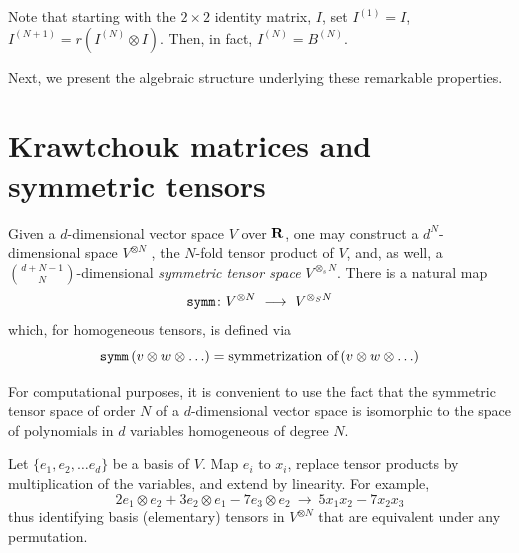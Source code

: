 \documentclass[12pt]{article}
\numberwithin{equation}{section}
\begin{document}
Note that starting with the $2\times2$ identity matrix, $I$, set $I^{(1)}=I$, \\ $I^{(N+1)}=r(I^{(N)}\otimes I)$. 
Then, in fact, $I^{(N)}=B^{(N)}$.\bigskip

Next, we present the algebraic structure underlying these remarkable properties.



\section{Krawtchouk matrices and symmetric tensors}
\label{sec:quantum}
\def\symm{{\tt symm}}

Given a $d$-dimensional vector space $V$ over ${\bf R}$,
one may construct a $d^N$-dimensional space $V^{\otimes N}$ ,
the $N$-fold tensor product of $V$, and, as well, a 
$
     {d+N-1\choose N}
$-dimensional {\sl symmetric tensor space} $V^{\otimes_s N}$. 
There is a natural map 
$$
  \symm\colon V^{\otimes N} \ \longrightarrow \ V^{\otimes_S N} 
$$
which, for homogeneous tensors, is defined via
$$
\symm\,(v\otimes w\otimes \ldots )= \hbox{symmetrization of}\,(v\otimes w\otimes \ldots)
$$

For computational purposes, it is convenient to use the fact that the
symmetric tensor space of order $N$ of a $d$-dimensional vector space is isomorphic to the 
space of polynomials in $d$ variables homogeneous of degree $N$.\bigskip

Let $\{e_1, e_2, \ldots e_d\}$ be a basis of $V$. Map $e_i$ to $x_i$, replace tensor products by
multiplication of the variables, and extend by linearity.  For example,
$$
2e_1\otimes e_2 +3 e_2\otimes e_1 -7e_3\otimes e_2 \ \longrightarrow \
5x_1x_2 -7x_2x_3
$$
thus identifying basis (elementary) tensors in $V^{\otimes N}$ that are equivalent under any permutation.
\\
\end{document}
